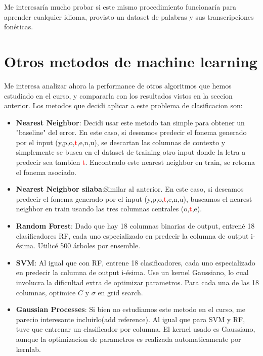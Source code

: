 \documentclass[paper=a4, fontsize=11pt]{scrartcl} %
\numberwithin{equation}{section} %
\numberwithin{figure}{section} %
\numberwithin{table}{section} %
\begin{document}
Me interesaría mucho probar si este mismo procedimiento funcionaría para aprender cualquier idioma, provisto un dataset de palabras y sus transcripciones fonéticas.

\section{ Otros metodos de machine learning }

Me interesa analizar ahora la performance de otros algoritmos que hemos estudiado en el curso, y compararla con los resultados vistos en la seccion anterior. Los metodos que decidi aplicar a este problema de clasificacion son:

\begin{itemize}
\item \textbf{Nearest Neighbor}: Decidi usar este metodo tan simple para obtener un "baseline" del error. En este caso, si deseamos predecir el fonema generado por el input (y,p,o,\textcolor{red}{t},e,n,u), se descartan las columnas de contexto y simplemente se busca en el dataset de training otro input donde la letra a predecir sea tambien \textcolor{red}{t}. Encontrado este nearest neighbor en train, se retorna el fonema asociado.

\item \textbf{Nearest Neighbor silaba}:Similar al anterior. En este caso, si deseamos predecir el fonema generado por el input (y,p,o,\textcolor{red}{t},e,n,u), buscamos el nearest neighbor en train usando las tres columnas centrales (o,\textcolor{red}{t},e). 

\item \textbf{Random Forest}: Dado que hay 18 columnas binarias de output, entrené 18 clasificadores RF, cada uno especializado en predecir la columna de output i-ésima. Utilicé 500 árboles por ensemble.

\item \textbf{SVM}: Al igual que con RF, entrene 18 clasificadores, cada uno especializado en predecir la columna de output i-ésima. Use un kernel Gaussiano, lo cual involucra la dificultad extra de optimizar parametros. Para cada una de las 18 columnas, optimice $C$ y $\sigma$ en grid search.

\item \textbf{Gaussian Processes}: Si bien no estudiamos este metodo en el curso, me parecio interesante incluirlo(add reference). Al igual que para SVM y RF, tuve que entrenar un clasificador por columna. El kernel usado es  Gaussiano, aunque la optimizacion de parametros es realizada automaticamente por kernlab.

\end{itemize}
\end{document}
